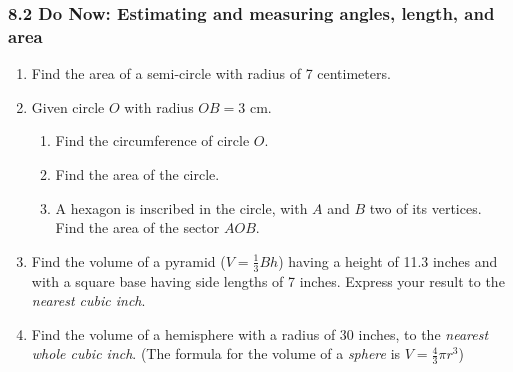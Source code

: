 \documentclass[12pt, twoside]{article}
\begin{document}
\subsubsection*{8.2 Do Now: Estimating and measuring angles, length, and area}
 \begin{enumerate}

  \item Find the area of a semi-circle with radius of 7 centimeters. \vspace{2cm}

  \item Given circle $O$ with radius $OB=3$ cm.
    \begin{multicols}{2}
    \raggedcolumns
    \begin{enumerate}
      \item Find the circumference of circle $O$. \vspace{1.7cm}
      \item Find the area of the circle.  \vspace{2cm}
      \item A hexagon is inscribed in the circle, with $A$ and $B$ two of its vertices. \\[0.25cm]
      Find the area of the sector $AOB$. \vspace{1.5cm}
    \end{enumerate}
    \end{multicols}  \vspace{4cm}

  \item Find the volume of a pyramid ($V=\frac{1}{3}Bh$) having a height of 11.3 inches and with a square base having side lengths of 7 inches. Express your result to the \emph{nearest cubic inch}. \vspace{5cm}

\newpage
  \item Find the volume of a hemisphere with a radius of 30 inches, to the \emph{nearest whole cubic inch}. (The formula for the volume of a \emph{sphere} is $V=\frac{4}{3}\pi r^3$) \vspace{5cm}


\end{enumerate}
\end{document}
